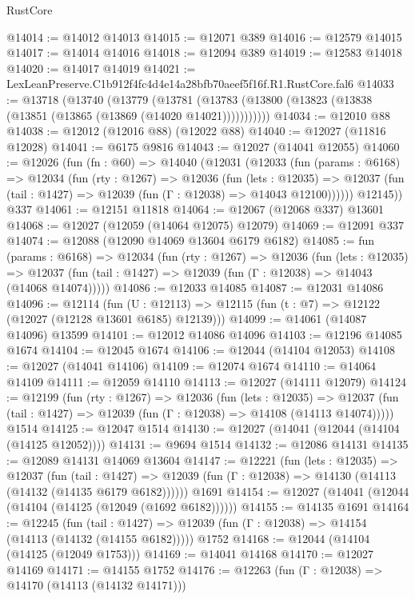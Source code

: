 \begin{lexlean}{RustCore}
\begin{coremodule}
@14014 := @14012 @14013
@14015 := @12071 @389
@14016 := @12579 @14015
@14017 := @14014 @14016
@14018 := @12094 @389
@14019 := @12583 @14018
@14020 := @14017 @14019
@14021 := LexLeanPreserve.C1b912f4fc4d4e14a28bfb70aeef5f16f.R1.RustCore.fal6
@14033 := @13718
    (@13740
      (@13779
        (@13781 (@13783 (@13800 (@13823 (@13838 (@13851 (@13865 (@13869 (@14020 @14021)))))))))))
@14034 := @12010 @88
@14038 := @12012 (@12016 @88) (@12022 @88)
@14040 := @12027 (@11816 @12028)
@14041 := @6175 @9816
@14043 := @12027 (@14041 @12055)
@14060 := @12026
    (fun (fn : @60) =>
    @14040
      (@12031
        (@12033
          (fun (params : @6168) =>
          @12034
            (fun (rty : @1267) =>
            @12036
              (fun (lets : @12035) =>
              @12037 (fun (tail : @1427) => @12039 (fun (Γ : @12038) => @14043 @12100))))))
        @12145))
    @337
@14061 := @12151 @11818
@14064 := @12067 (@12068 @337) @13601
@14068 := @12027 (@12059 (@14064 @12075) @12079)
@14069 := @12091 @337
@14074 := @12088 (@12090 @14069 @13604 @6179 @6182)
@14085 := fun (params : @6168) =>
  @12034
    (fun (rty : @1267) =>
    @12036
      (fun (lets : @12035) =>
      @12037 (fun (tail : @1427) => @12039 (fun (Γ : @12038) => @14043 (@14068 @14074)))))
@14086 := @12033 @14085
@14087 := @12031 @14086
@14096 := @12114
    (fun (U : @12113) => @12115 (fun (t : @7) => @12122 (@12027 (@12128 @13601 @6185) @12139)))
@14099 := @14061 (@14087 @14096) @13599
@14101 := @12012 @14086 @14096
@14103 := @12196 @14085 @1674
@14104 := @12045 @1674
@14106 := @12044 (@14104 @12053)
@14108 := @12027 (@14041 @14106)
@14109 := @12074 @1674
@14110 := @14064 @14109
@14111 := @12059 @14110
@14113 := @12027 (@14111 @12079)
@14124 := @12199
    (fun (rty : @1267) =>
    @12036
      (fun (lets : @12035) =>
      @12037 (fun (tail : @1427) => @12039 (fun (Γ : @12038) => @14108 (@14113 @14074)))))
    @1514
@14125 := @12047 @1514
@14130 := @12027 (@14041 (@12044 (@14104 (@14125 @12052))))
@14131 := @9694 @1514
@14132 := @12086 @14131
@14135 := @12089 @14131 @14069 @13604
@14147 := @12221
    (fun (lets : @12035) =>
    @12037
      (fun (tail : @1427) =>
      @12039 (fun (Γ : @12038) => @14130 (@14113 (@14132 (@14135 @6179 @6182))))))
    @1691
@14154 := @12027 (@14041 (@12044 (@14104 (@14125 (@12049 (@1692 @6182))))))
@14155 := @14135 @1691
@14164 := @12245
    (fun (tail : @1427) => @12039 (fun (Γ : @12038) => @14154 (@14113 (@14132 (@14155 @6182)))))
    @1752
@14168 := @12044 (@14104 (@14125 (@12049 @1753)))
@14169 := @14041 @14168
@14170 := @12027 @14169
@14171 := @14155 @1752
@14176 := @12263 (fun (Γ : @12038) => @14170 (@14113 (@14132 @14171)))

\end{coremodule}
\end{lexlean}
